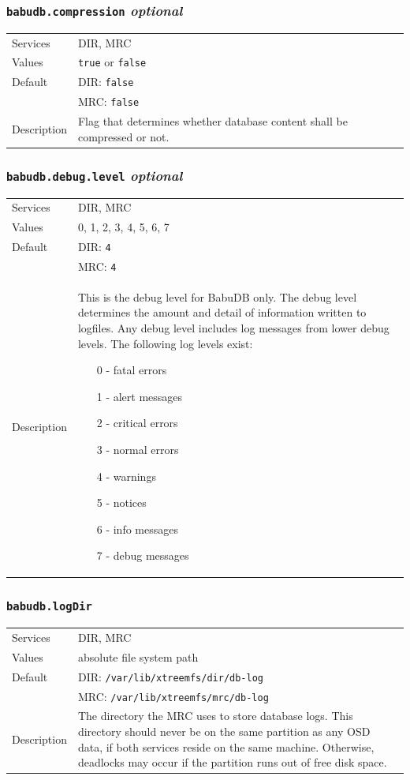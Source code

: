 \documentclass[a4paper,10pt]{book}
\begin{document}
\subsubsection{\texttt{babudb.compression} \textit{optional}}
\begin{tabular}{lp{10cm}}
 Services & DIR, MRC\\
 Values   & \texttt{true} or \texttt{false}\\
 Default  & DIR: \texttt{false}\\
          & MRC: \texttt{false}\\
 Description & Flag that determines whether database content shall be compressed or not.
\end{tabular}

\subsubsection{\texttt{babudb.debug.level} \textit{optional}}
\begin{tabular}{lp{10cm}}
 Services & DIR, MRC\\
 Values   & 0, 1, 2, 3, 4, 5, 6, 7 \\
 Default  & DIR: \texttt{4}\\
		  & MRC: \texttt{4}\\
 Description & This is the debug level for BabuDB only. The debug level determines the amount and detail of information written to logfiles. Any debug level includes log messages from lower debug levels. The following log levels exist:
\begin{enumerate}
 \item[0 -] fatal errors
 \item[1 -] alert messages
 \item[2 -] critical errors
 \item[3 -] normal errors
 \item[4 -] warnings
 \item[5 -] notices
 \item[6 -] info messages
 \item[7 -] debug messages
\end{enumerate}
\end{tabular}

\subsubsection{\texttt{babudb.logDir}}
\begin{tabular}{lp{10cm}}
 Services & DIR, MRC\\
 Values   & absolute file system path\\
 Default  & DIR: \texttt{/var/lib/xtreemfs/dir/db-log}\\
          & MRC: \texttt{/var/lib/xtreemfs/mrc/db-log}\\
 Description & The directory the MRC uses to store database logs. This directory should never be on the same partition as any OSD data, if both services reside on the same machine. Otherwise, deadlocks may occur if the partition runs out of free disk space.
\end{tabular}
\end{document}
